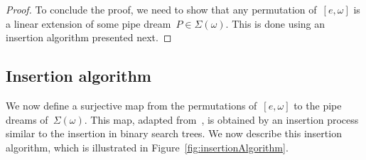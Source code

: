 \documentclass{amsart}
\theoremstyle{definition}
\newcommand{\fref}[1]{Figure~\ref{#1}} %
\newcommand{\acyclicPipeDreams}{\Sigma} %
\newcommand{\less}{\vartriangleleft} %
\newcommand{\contactLess}[1]{\less_{#1}} %
\begin{document}
\begin{proof}

To conclude the proof, we need to show that any permutation of~$[e,\omega]$ is a linear extension of some pipe dream~$P \in \acyclicPipeDreams(\omega)$. This is done using an insertion algorithm presented next.
\end{proof}


\subsection{Insertion algorithm}
\label{subsec:insertionAlgorithm}

We now define a surjective map from the permutations of~$[e, \omega]$ to the pipe dreams of~$\acyclicPipeDreams(\omega)$. This map, adapted from~\cite{Pilaud-BrickAlgebra}, is obtained by an insertion process similar to the insertion in binary search trees. 
We now describe this insertion algorithm, which is illustrated in \fref{fig:insertionAlgorithm}. 
\end{document}
